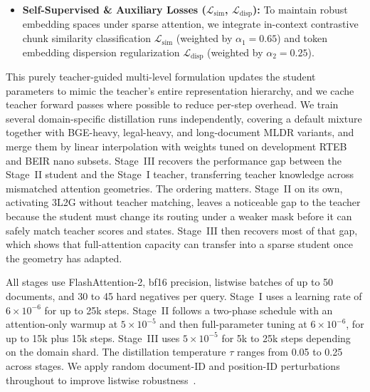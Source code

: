 \documentclass{article}
\begin{document}
\begin{itemize}[leftmargin=*]
  \begin{equation}
    \mathcal{L}_{\mathrm{embed}} = 1 - \frac{1}{1 + K} \sum_{j=1}^{1+K} \cos(\mathbf{e}_{\mathrm{std}, j}, \mathbf{e}_{\mathrm{tch}, j}),
  \end{equation}
  weighted by $\beta_{3} = 0.65$.
  \item \textbf{Self-Supervised \& Auxiliary Losses ($\mathcal{L}_{\mathrm{sim}}$, $\mathcal{L}_{\mathrm{disp}}$):}
  To maintain robust embedding spaces under sparse attention, we integrate in-context contrastive chunk similarity classification $\mathcal{L}_{\mathrm{sim}}$ (weighted by $\alpha_{1} = 0.65$) and token embedding dispersion regularization $\mathcal{L}_{\mathrm{disp}}$ (weighted by $\alpha_{2} = 0.25$).
\end{itemize}

This purely teacher-guided multi-level formulation updates the student parameters to mimic the teacher's entire representation hierarchy, and we cache teacher forward passes where possible to reduce per-step overhead. We train several domain-specific distillation runs independently, covering a default mixture together with BGE-heavy, legal-heavy, and long-document MLDR variants, and merge them by linear interpolation with weights tuned on development RTEB and BEIR nano subsets. Stage~III recovers the performance gap between the Stage~II student and the Stage~I teacher, transferring teacher knowledge across mismatched attention geometries. The ordering matters. Stage~II on its own, activating 3L2G without teacher matching, leaves a noticeable gap to the teacher because the student must change its routing under a weaker mask before it can safely match teacher scores and states. Stage~III then recovers most of that gap, which shows that full-attention capacity can transfer into a sparse student once the geometry has adapted.

All stages use FlashAttention-2, bf16 precision, listwise batches of up to 50 documents, and 30 to 45 hard negatives per query. Stage~I uses a learning rate of $6\times10^{-6}$ for up to 25k steps. Stage~II follows a two-phase schedule with an attention-only warmup at $5\times10^{-5}$ and then full-parameter tuning at $6\times10^{-6}$, for up to 15k plus 15k steps. Stage~III uses $5\times10^{-5}$ for 5k to 25k steps depending on the domain shard. The distillation temperature $\tau$ ranges from 0.05 to 0.25 across stages. We apply random document-ID and position-ID perturbations throughout to improve listwise robustness~\cite{wang2025jinarerankerv3}.
\end{document}
